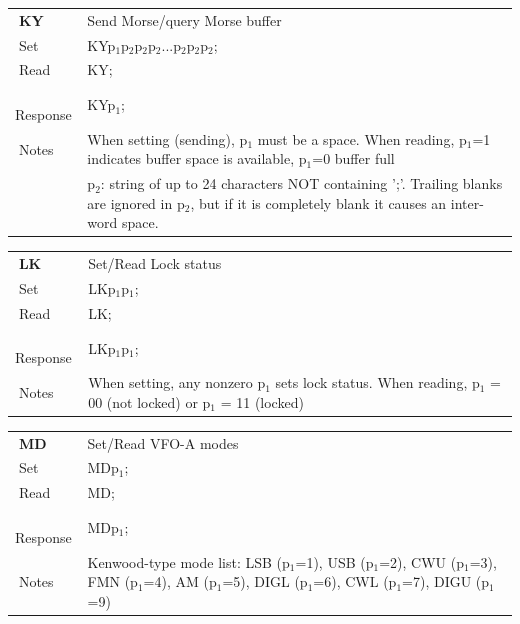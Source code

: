 \documentclass[12pt]{book}
\begin{document}
\begin{center}
\begin{tabular}{|p{2cm}|p{11cm}|}
\toprule
$\phantom{\Big|}$\textbf{\large KY} & Send Morse/query Morse buffer \\\cline{1-2}
$\phantom{\Big|}${\large Set} & {KYp$_1$p$_2$p$_2$p$_2$...p$_2$p$_2$p$_2$;} \\\hline
$\phantom{\Big|}${\large Read} & {KY;} \\\hline
$\phantom{\Big|}${\large Response} & {KYp$_1$;} \\\hline
$\phantom{\Big|}${\large Notes} & \multicolumn{1}{|p{11cm}|}{When setting (sending), p$_1$ must be a space. When reading, p$_1$=1 indicates buffer space is available, p$_1$=0  buffer full} \\
 & \multicolumn{1}{|p{11cm}|}{p$_2$: string of up to 24 characters NOT containing ';'. Trailing blanks are ignored in p$_2$, but if it is completely blank it causes an inter-word space.} \\
\bottomrule
\end{tabular}
\end{center}

\begin{center}
\begin{tabular}{|p{2cm}|p{11cm}|}
\toprule
$\phantom{\Big|}$\textbf{\large LK} & Set/Read Lock status \\\cline{1-2}
$\phantom{\Big|}${\large Set} & {LKp$_1$p$_1$;} \\\hline
$\phantom{\Big|}${\large Read} & {LK;} \\\hline
$\phantom{\Big|}${\large Response} & {LKp$_1$p$_1$;} \\\hline
$\phantom{\Big|}${\large Notes} & \multicolumn{1}{|p{11cm}|}{When setting, any nonzero p$_1$ sets lock status. When reading, p$_1$ = 00 (not locked) or p$_1$ = 11 (locked)} \\
\bottomrule
\end{tabular}
\end{center}

\begin{center}
\begin{tabular}{|p{2cm}|p{11cm}|}
\toprule
$\phantom{\Big|}$\textbf{\large MD} & Set/Read VFO-A modes \\\cline{1-2}
$\phantom{\Big|}${\large Set} & {MDp$_1$;} \\\hline
$\phantom{\Big|}${\large Read} & {MD;} \\\hline
$\phantom{\Big|}${\large Response} & {MDp$_1$;} \\\hline
$\phantom{\Big|}${\large Notes} & \multicolumn{1}{|p{11cm}|}{Kenwood-type  mode  list: LSB (p$_1$=1), USB (p$_1$=2), CWU (p$_1$=3), FMN (p$_1$=4), AM (p$_1$=5), DIGL (p$_1$=6), CWL (p$_1$=7), DIGU (p$_1$=9)} \\
\bottomrule
\end{tabular}
\end{center}
\end{document}
